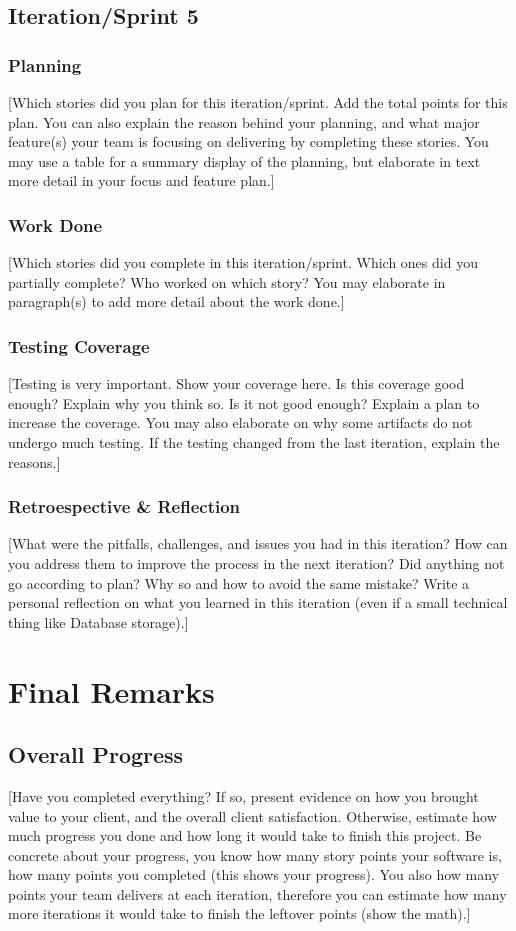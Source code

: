 \documentclass{article}
\begin{document}
\subsection{Iteration/Sprint 5}
\subsubsection{Planning}
[Which stories did you plan for this iteration/sprint. Add the total points for this plan. You can also explain the reason behind your planning, and what major feature(s) your team is focusing on delivering by completing these stories. You may use a table for a summary display of the planning, but elaborate in text more detail in your focus and feature plan.]

\subsubsection{Work Done}
[Which stories did you complete in this iteration/sprint. Which ones did you partially complete? Who worked on which story? You may elaborate in paragraph(s) to add more detail about the work done.]

\subsubsection{Testing Coverage}
[Testing is very important. Show your coverage here. Is this coverage good enough? Explain why you think so. Is it not good enough? Explain a plan to increase the coverage. You may also elaborate on why some artifacts do not undergo much testing. If the testing changed from the last iteration, explain the reasons.]

\subsubsection{Retroespective \& Reflection}
[What were the pitfalls, challenges, and issues you had in this iteration? How can you address them to improve the process in the next iteration? Did anything not go according to plan? Why so and how to avoid the same mistake? Write a personal reflection on what you learned in this iteration (even if a small technical thing like Database storage).]

\section{Final Remarks}

\subsection{Overall Progress}
[Have you completed everything? If so, present evidence on how you brought value to your client, and the overall client satisfaction. Otherwise, estimate how much progress you done and how long it would take to finish this project. Be concrete about your progress, you know how many story points your software is, how many points you completed (this shows your progress). You also how many points your team delivers at each iteration, therefore you can estimate how many more iterations it would take to finish the leftover points (show the math).]
\end{document}
